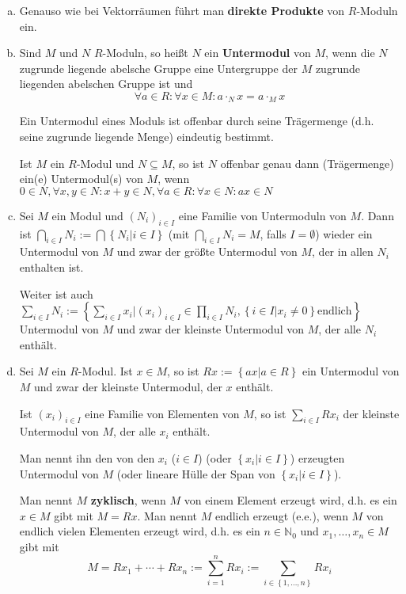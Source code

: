 \documentclass{book}
\newcommand{\N}{\mathbb{N}}
\newcommand{\set}[1]{\left\{ #1 \right\}}
\begin{document}
	\begin{enumerate}[(a)]
		\item Genauso wie bei Vektorr\"aumen f\"uhrt man {\bf direkte Produkte} von $R$-Moduln ein.
		
		\item Sind $M$ und $N$ $R$-Moduln, so hei\ss t $N$ ein {\bf Untermodul} von $M$, wenn die $N$ zugrunde liegende abelsche Gruppe eine Untergruppe der $M$ zugrunde liegenden abelschen Gruppe ist und 
			\[\forall a \in R: \forall x \in M: a \cdot_N x = a \cdot_M x\]
			
		Ein Untermodul eines Moduls ist offenbar durch seine Tr\"agermenge (d.h. seine zugrunde liegende Menge) eindeutig bestimmt.
		
		Ist $M$ ein $R$-Modul und $N \subseteq M$, so ist $N$ offenbar genau dann (Tr\"agermenge) ein(e) Untermodul(s) von $M$, wenn $0\in N, \forall x, y\in N: x + y \in N, \forall a \in R: \forall x \in N: ax \in N$
		
		\item Sei $M$ ein Modul und $(N_i)_{i \in I}$ eine Familie von Untermoduln von $M$. Dann ist 
		$\bigcap_{i \in I} N_i := \bigcap \set{N_i | i \in I}$ (mit $\bigcap_{i \in I} N_i = M$, falls $I = \emptyset$)
		wieder ein Untermodul von $M$ und zwar der gr\"o\ss te Untermodul von $M$, der in allen $N_i$ enthalten ist.
		
		Weiter ist auch $\sum_{i \in I} N_i := \set{\sum_{i \in I} x_i | (x_i)_{i \in I} \in \prod_{i\in I} N_i, \set{i \in I| x_i \neq 0} \textrm{endlich}}$ Untermodul von $M$ und zwar der kleinste Untermodul von $M$, der alle $N_i$ enth\"alt.
		
		\item Sei $M$ ein $R$-Modul. Ist $x \in M$, so ist $Rx := \set{ax| a \in R}$ ein Untermodul von $M$ und zwar der kleinste Untermodul, der $x$ enth\"alt.
		
		Ist $(x_i)_{i \in I}$ eine Familie von Elementen von $M$, so ist $\sum_{i \in I} Rx_i$ der kleinste Untermodul von $M$, der alle $x_i$ enth\"alt.
		
		Man nennt ihn den von den $x_i$ ($i \in I$) (oder $\set{x_i|i \in I}$) erzeugten Untermodul von $M$ (oder lineare H\"ulle der Span von $\set{x_i| i \in I}$). 
		
		Man nennt $M$ {\bf zyklisch}, wenn $M$ von einem Element erzeugt wird, d.h. es ein $x \in M$ gibt mit $M = Rx$. Man nennt $M$ endlich erzeugt (e.e.), wenn $M$ von endlich vielen Elementen
		erzeugt wird, d.h. es ein $n \in \N_0$ und $x_1, \dots, x_n \in M$ gibt mit 
		\[M = Rx_1 + \cdots + Rx_n := \sum_{i=1}^{n} Rx_i := \sum_{i \in \set{1, \dots, n}} Rx_i\] 
	\end{enumerate}


	\tableofcontents
\end{document}
